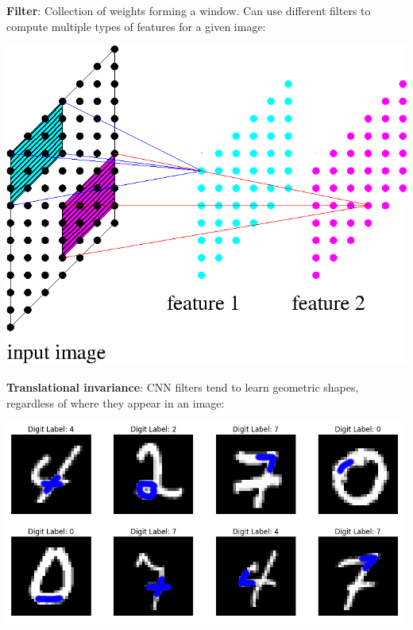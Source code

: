 \documentclass[12pt,t]{beamer}
\begin{document}
\begin{frame}

{\bf Filter}: Collection of weights forming a window.  Can use different filters to compute multiple types of features for a given image:

\centerline{
\includegraphics[height=0.4\textheight]{./images/convolution2.png} 
}

{\bf Translational invariance}: CNN filters tend to learn geometric shapes, regardless of where they appear in an image:

\centerline{
\includegraphics[height=0.3\textheight]{./images/convfeat.png} 
}

\end{frame}
\end{document}
